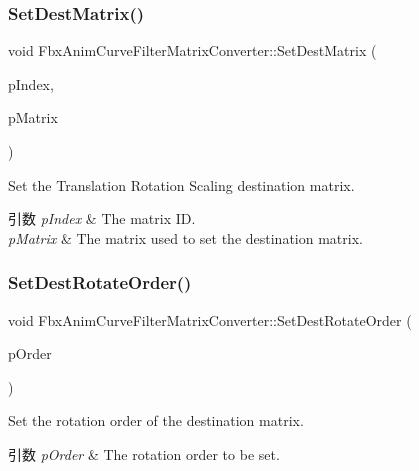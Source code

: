 \subsubsection{\texorpdfstring{Set\+Dest\+Matrix()}{SetDestMatrix()}}
{\footnotesize\ttfamily void Fbx\+Anim\+Curve\+Filter\+Matrix\+Converter\+::\+Set\+Dest\+Matrix (\begin{DoxyParamCaption}\item[{\hyperlink{class_fbx_anim_curve_filter_matrix_converter_a41638d5acd6d14ef0f095ab75b18ee69}{E\+Matrix\+Index}}]{p\+Index,  }\item[{\hyperlink{class_fbx_a_matrix}{Fbx\+A\+Matrix} \&}]{p\+Matrix }\end{DoxyParamCaption})}

Set the Translation Rotation Scaling destination matrix. 
\begin{DoxyParams}{引数}
{\em p\+Index} & The matrix ID. \\
\hline
{\em p\+Matrix} & The matrix used to set the destination matrix. \\
\hline
\end{DoxyParams}
\mbox{\label{class_fbx_anim_curve_filter_matrix_converter_a115f94c96f1f14b55e4f3f9b6bc5977a}} 
\subsubsection{\texorpdfstring{Set\+Dest\+Rotate\+Order()}{SetDestRotateOrder()}}
{\footnotesize\ttfamily void Fbx\+Anim\+Curve\+Filter\+Matrix\+Converter\+::\+Set\+Dest\+Rotate\+Order (\begin{DoxyParamCaption}\item[{\hyperlink{class_fbx_euler_a7d5bec7eedb022b4dae56894ab7a9939}{Fbx\+Euler\+::\+E\+Order}}]{p\+Order }\end{DoxyParamCaption})}

Set the rotation order of the destination matrix. 
\begin{DoxyParams}{引数}
{\em p\+Order} & The rotation order to be set. \\
\hline
\end{DoxyParams}
\mbox{\label{class_fbx_anim_curve_filter_matrix_converter_a4b49dc7704c847a3b909cf7d9052f7a7}} 
